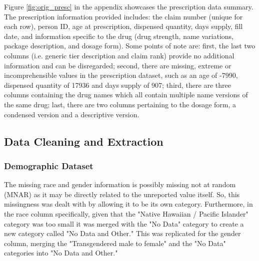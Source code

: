 \documentclass[twoside,10.5pt]{article}
\begin{document}
Figure \ref{fig:orig_presc} in the appendix showcases the prescription data summary. The prescription information provided includes: the claim number (unique for each row), person ID, age at prescription, dispensed quantity, days supply, fill date, and information specific to the drug (drug strength, name variations, package description, and dosage form). Some points of note are: first, the last two columns (i.e. generic tier description and claim rank) provide no additional information and can be disregarded; second, there are missing, extreme or incomprehensible values in the prescription dataset, such as an age of -7990, dispensed quantity of 17936 and days supply of 907; third, there are three columns containing the drug names which all contain multiple name versions of the same drug; last, there are two columns pertaining to the dosage form, a condensed version and a descriptive version.

\subsection{Data Cleaning and Extraction}
\subsubsection{Demographic Dataset}
The missing race and gender information is possibly missing not at random (MNAR) as it may be directly related to the unreported value itself. So, this missingness was dealt with by allowing it to be its own category. Furthermore, in the race column specifically, given that the "Native Hawaiian / Pacific Islander" category was too small it was merged with the "No Data" category to create a new category called "No Data and Other." This was replicated for the gender column, merging the "Transgendered male to female" and the "No Data" categories into "No Data and Other."  
\end{document}
